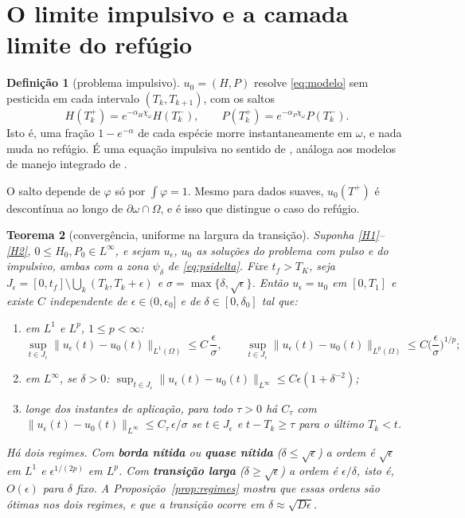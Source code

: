 \documentclass[11pt,a4paper]{article}
\numberwithin{equation}{section}
\newtheorem{teorema}{Teorema}[section]
\theoremstyle{definition}
\newtheorem{definicao}[teorema]{Definição}
\theoremstyle{remark}
\begin{document}
\section{O limite impulsivo e a camada limite do refúgio}\label{sec:limite}

\begin{definicao}[problema impulsivo]
$u_0=(H,P)$ resolve \eqref{eq:modelo} sem pesticida em cada intervalo $(T_k,T_{k+1})$, com os saltos
\begin{equation}\label{eq:salto}
H(T_k^+)=e^{-\alpha_H\chi_\omega}H(T_k^-),\qquad P(T_k^+)=e^{-\alpha_P\chi_\omega}P(T_k^-).
\end{equation}
Isto é, uma fração $1-e^{-\alpha}$ de cada espécie morre instantaneamente em $\omega$, e nada muda no
refúgio. É uma equação impulsiva no sentido de \cite{Lakshmikantham}, análoga aos modelos de
manejo integrado de \cite{Tang}.
\end{definicao}

O salto depende de $\varphi$ só por $\int\varphi=1$. Mesmo para dados suaves, $u_0(T^+)$ é
descontínua ao longo de $\partial\omega\cap\Omega$, e é isso que distingue o caso do refúgio.

\begin{teorema}[convergência, uniforme na largura da transição]\label{teo:limite}
Suponha \ref{H1}--\ref{H2}, $0\le H_0,P_0\in L^\infty$, e sejam $u_\epsilon$, $u_0$ as soluções do
problema com pulso e do impulsivo, ambas com a zona $\psi_\delta$ de \eqref{eq:psidelta}. Fixe
$t_f>T_K$, seja $J_\epsilon=[0,t_f]\setminus\bigcup_k(T_k,T_k+\epsilon)$ e
$\sigma=\max\{\delta,\sqrt\epsilon\}$. Então $u_\epsilon=u_0$ em $[0,T_1]$ e existe $C$ independente de
$\epsilon\in(0,\epsilon_0]$ \emph{e de} $\delta\in[0,\delta_0]$ tal que:
\begin{enumerate}
\item[(a)] em $L^1$ e $L^p$, $1\le p<\infty$:
\begin{equation}\label{eq:convL1}
\sup_{t\in J_\epsilon}\|u_\epsilon(t)-u_0(t)\|_{L^1(\Omega)}\le C\,\frac{\epsilon}{\sigma},\qquad
\sup_{t\in J_\epsilon}\|u_\epsilon(t)-u_0(t)\|_{L^p(\Omega)}\le C\Big(\frac{\epsilon}{\sigma}\Big)^{1/p};
\end{equation}
\item[(b)] em $L^\infty$, se $\delta>0$: $\sup_{t\in J_\epsilon}\|u_\epsilon(t)-u_0(t)\|_{L^\infty}\le C\epsilon(1+\delta^{-2})$;
\item[(c)] longe dos instantes de aplicação, para todo $\tau>0$ há $C_\tau$ com
$\|u_\epsilon(t)-u_0(t)\|_{L^\infty}\le C_\tau\,\epsilon/\sigma$ se $t\in J_\epsilon$ e
$t-T_k\ge\tau$ para o último $T_k<t$.
\end{enumerate}
Há dois regimes. Com \textbf{borda nítida} ou \textbf{quase nítida} ($\delta\le\sqrt\epsilon$) a
ordem é $\sqrt\epsilon$ em $L^1$ e $\epsilon^{1/(2p)}$ em $L^p$. Com \textbf{transição larga}
($\delta\ge\sqrt\epsilon$) a ordem é $\epsilon/\delta$, isto é, $O(\epsilon)$ para $\delta$ fixo.
A Proposição~\ref{prop:regimes} mostra que essas ordens são ótimas nos dois regimes, e que a
transição ocorre em $\delta\approx\sqrt{D\epsilon}$.
\end{teorema}
\end{document}

